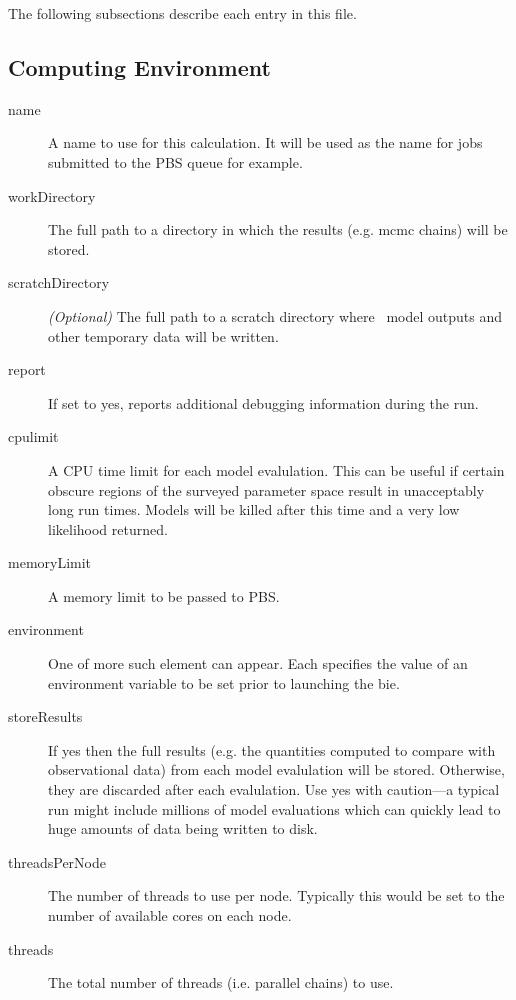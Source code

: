 The following subsections describe each entry in this file.

\subsection{Computing Environment}

\begin{description}
\item[{\normalfont \ttfamily name}] A name to use for this calculation. It will be used as the name for jobs submitted to the PBS queue for example.
\item[{\normalfont \ttfamily workDirectory}] The full path to a directory in which the results (e.g. \gls{mcmc} chains) will be stored.
\item[{\normalfont \ttfamily scratchDirectory}] \emph{(Optional)} The full path to a scratch directory where \glc\ model outputs and other temporary data will be written.
\item[{\normalfont \ttfamily report}] If set to {\normalfont \ttfamily yes}, reports additional debugging information during the run.
\item[{\normalfont \ttfamily cpulimit}] A CPU time limit for each model evalulation. This can be useful if certain obscure regions of the surveyed parameter space result in unacceptably long run times. Models will be killed after this time and a very low likelihood returned.
\item[{\normalfont \ttfamily memoryLimit}] A memory limit to be passed to PBS.
\item[{\normalfont \ttfamily environment}] One of more such element can appear. Each specifies the value of an environment variable to be set prior to launching the \gls{bie}.
\item[{\normalfont \ttfamily storeResults}] If {\normalfont \ttfamily yes} then the full results (e.g. the quantities computed to compare with observational data) from each model evalulation will be stored. Otherwise, they are discarded after each evalulation. Use {\normalfont \ttfamily yes} with caution---a typical run might include millions of model evaluations which can quickly lead to huge amounts of data being written to disk.
\item[{\normalfont \ttfamily threadsPerNode}] The number of threads to use per node. Typically this would be set to the number of available cores on each node.
\item[{\normalfont \ttfamily threads}] The total number of threads (i.e. parallel chains) to use.

\end{description}
